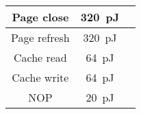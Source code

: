 \begin{table}[h]
{\begin{tabular}{|c|c|c|}
      Page close                      &   \SI[per-mode=symbol]{320}{\pico\joule }     &                                                               \\\hline
      Page refresh                    &   \SI[per-mode=symbol]{320}{\pico\joule }     &                                                               \\\hline
      Cache read                      &   \SI[per-mode=symbol]{ 64}{\pico\joule }     &                                                               \\\hline
      Cache write                     &   \SI[per-mode=symbol]{ 64}{\pico\joule }     &                                                               \\\hline
      NOP                             &   \SI[per-mode=symbol]{ 20}{\pico\joule }     &                                                               \\\hline
    \end{tabular}
    }
  \captionsetup{justification=centering, skip=9pt}
  \vspace{0.0cm}
  \label{tab:DiRAM4 characteristics}
\end{table}

